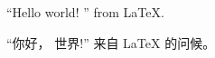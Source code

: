\documentclass{ctexart}
\begin{document}
``Hello world! '' from \LaTeX.

“你好， 世界!'' 来自 \LaTeX{} 的问候。
\end{document}
